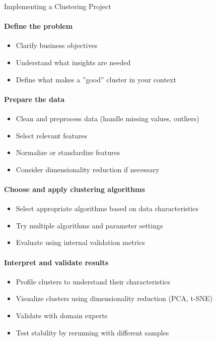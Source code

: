 \begin{KR}{Implementing a Clustering Project}
\paragraph{Define the problem}
\begin{itemize}
    \item Clarify business objectives
    \item Understand what insights are needed
    \item Define what makes a ''good'' cluster in your context
\end{itemize}

\paragraph{Prepare the data}
\begin{itemize}
    \item Clean and preprocess data (handle missing values, outliers)
    \item Select relevant features
    \item Normalize or standardize features
    \item Consider dimensionality reduction if necessary
\end{itemize}

\paragraph{Choose and apply clustering algorithms}
\begin{itemize}
    \item Select appropriate algorithms based on data characteristics
    \item Try multiple algorithms and parameter settings
    \item Evaluate using internal validation metrics
\end{itemize}

\paragraph{Interpret and validate results}
\begin{itemize}
    \item Profile clusters to understand their characteristics
    \item Visualize clusters using dimensionality reduction (PCA, t-SNE)
    \item Validate with domain experts
    \item Test stability by rerunning with different samples
\end{itemize}


\end{KR}
